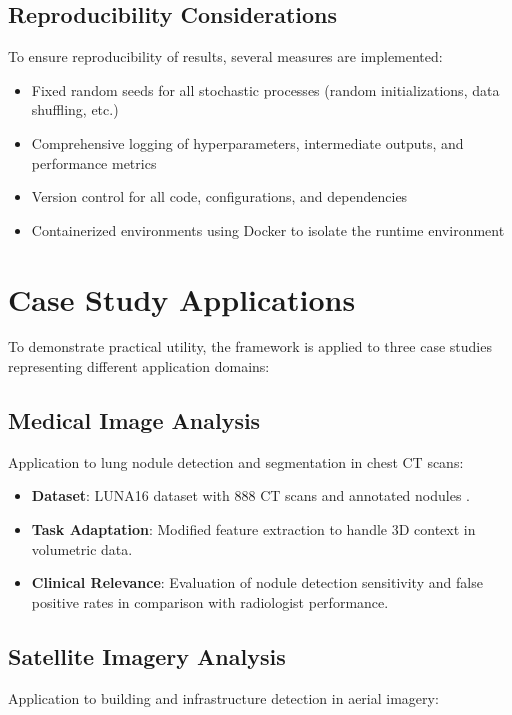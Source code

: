 \subsection{Reproducibility Considerations}
To ensure reproducibility of results, several measures are implemented:

\begin{itemize}
    \item Fixed random seeds for all stochastic processes (random initializations, data shuffling, etc.)
    
    \item Comprehensive logging of hyperparameters, intermediate outputs, and performance metrics
    
    \item Version control for all code, configurations, and dependencies
    
    \item Containerized environments using Docker to isolate the runtime environment
\end{itemize}

\section{Case Study Applications}

To demonstrate practical utility, the framework is applied to three case studies representing different application domains:

\subsection{Medical Image Analysis}
Application to lung nodule detection and segmentation in chest CT scans:

\begin{itemize}
    \item \textbf{Dataset}: LUNA16 dataset with 888 CT scans and annotated nodules \cite{setio2017validation}.
    
    \item \textbf{Task Adaptation}: Modified feature extraction to handle 3D context in volumetric data.
    
    \item \textbf{Clinical Relevance}: Evaluation of nodule detection sensitivity and false positive rates in comparison with radiologist performance.
\end{itemize}

\subsection{Satellite Imagery Analysis}
Application to building and infrastructure detection in aerial imagery:

